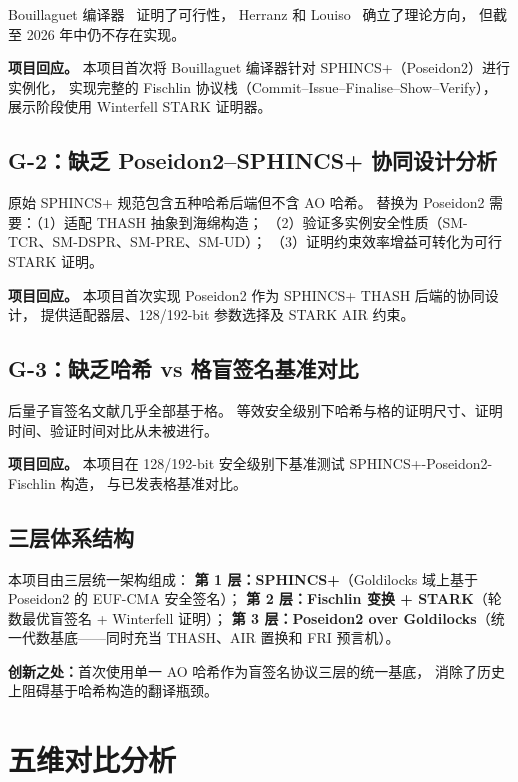 \documentclass[11pt,a4paper]{ctexart}
\begin{document}
Bouillaguet 编译器~\cite{Bouillaguet2026BlindingPH} 证明了可行性，
Herranz 和 Louiso~\cite{Herranz2025HashBased} 确立了理论方向，
但截至 2026 年中仍不存在实现。

\noindent\textbf{项目回应。}
本项目首次将 Bouillaguet 编译器针对 SPHINCS+（Poseidon2）进行实例化，
实现完整的 Fischlin 协议栈（Commit--Issue--Finalise--Show--Verify），
展示阶段使用 Winterfell STARK 证明器。

\subsection{G-2：缺乏 Poseidon2--SPHINCS+ 协同设计分析}

原始 SPHINCS+ 规范包含五种哈希后端但不含 AO 哈希。
替换为 Poseidon2 需要：（1）适配 THASH 抽象到海绵构造；
（2）验证多实例安全性质（SM-TCR、SM-DSPR、SM-PRE、SM-UD）；
（3）证明约束效率增益可转化为可行 STARK 证明。

\noindent\textbf{项目回应。}
本项目首次实现 Poseidon2 作为 SPHINCS+ THASH 后端的协同设计，
提供适配器层、128/192-bit 参数选择及 STARK AIR 约束。

\subsection{G-3：缺乏哈希 vs 格盲签名基准对比}

后量子盲签名文献几乎全部基于格。
等效安全级别下哈希与格的证明尺寸、证明时间、验证时间对比从未被进行。

\noindent\textbf{项目回应。}
本项目在 128/192-bit 安全级别下基准测试 SPHINCS+-Poseidon2-Fischlin 构造，
与已发表格基准对比。

\subsection{三层体系结构}

本项目由三层统一架构组成：
\textbf{第 1 层：SPHINCS+}（Goldilocks 域上基于 Poseidon2 的 EUF-CMA 安全签名）；
\textbf{第 2 层：Fischlin 变换 + STARK}（轮数最优盲签名 + Winterfell 证明）；
\textbf{第 3 层：Poseidon2 over Goldilocks}（统一代数基底——同时充当
THASH、AIR 置换和 FRI 预言机）。

\textbf{创新之处：}首次使用单一 AO 哈希作为盲签名协议三层的统一基底，
消除了历史上阻碍基于哈希构造的翻译瓶颈。

\section{五维对比分析}
\end{document}
